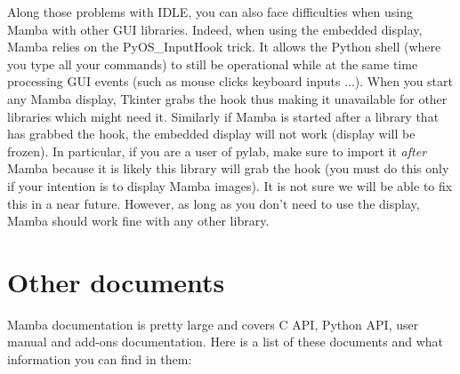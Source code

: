 \documentclass[a4paper,10pt,oneside]{article}
\begin{document}
Along those problems with IDLE, you can also face difficulties when using
Mamba with other GUI libraries. Indeed, when using the embedded display,
Mamba relies on the PyOS\_InputHook trick. It allows the Python shell (where 
you type all your commands) to still be operational while at the same time
processing GUI events (such as mouse clicks keyboard inputs ...). When you
start any Mamba display, Tkinter grabs the hook thus making it unavailable
for other libraries which might need it. Similarly if Mamba is started
after a library that has grabbed the hook, the embedded display will not
work (display will be frozen). In particular, if you are a user of pylab,
make sure to import it \textit{after} Mamba because it is likely
this library will grab the hook (you must do this only if your intention is to
display Mamba images). It is not sure we will be able to fix this in a near
future. However, as long as you don't need to use the display, Mamba should 
work fine with any other library.

\pagebreak

\section{Other documents}
\label{cha:other_docs}

Mamba documentation is pretty large and covers C API, Python API, user manual 
and add-ons documentation. Here is a list of these documents and what 
information you can find in them:
\end{document}
